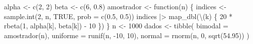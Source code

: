 \documentclass[
  10pt,
  ignorenonframetext,
]{beamer}
\newenvironment{Shaded}{\begin{snugshade}}{\end{snugshade}}
\newcommand{\AttributeTok}[1]{\textcolor[rgb]{0.40,0.45,0.13}{#1}}
\newcommand{\ConstantTok}[1]{\textcolor[rgb]{0.56,0.35,0.01}{#1}}
\newcommand{\ControlFlowTok}[1]{\textcolor[rgb]{0.00,0.23,0.31}{#1}}
\newcommand{\DecValTok}[1]{\textcolor[rgb]{0.68,0.00,0.00}{#1}}
\newcommand{\FloatTok}[1]{\textcolor[rgb]{0.68,0.00,0.00}{#1}}
\newcommand{\FunctionTok}[1]{\textcolor[rgb]{0.28,0.35,0.67}{#1}}
\newcommand{\NormalTok}[1]{\textcolor[rgb]{0.00,0.23,0.31}{#1}}
\newcommand{\OtherTok}[1]{\textcolor[rgb]{0.00,0.23,0.31}{#1}}
\newcommand{\SpecialCharTok}[1]{\textcolor[rgb]{0.37,0.37,0.37}{#1}}
\begin{document}
\begin{frame}[fragile]
\begin{Shaded}
\begin{Highlighting}[]
\NormalTok{alpha }\OtherTok{\textless{}{-}} \FunctionTok{c}\NormalTok{(}\DecValTok{2}\NormalTok{, }\DecValTok{2}\NormalTok{)}
\NormalTok{beta }\OtherTok{\textless{}{-}} \FunctionTok{c}\NormalTok{(}\DecValTok{6}\NormalTok{, }\FloatTok{0.8}\NormalTok{)}
\NormalTok{amostrador }\OtherTok{\textless{}{-}} \ControlFlowTok{function}\NormalTok{(n) \{}
\NormalTok{  indices }\OtherTok{\textless{}{-}} \FunctionTok{sample.int}\NormalTok{(}\DecValTok{2}\NormalTok{, n, }\ConstantTok{TRUE}\NormalTok{, }\AttributeTok{prob =} \FunctionTok{c}\NormalTok{(}\FloatTok{0.5}\NormalTok{, }\FloatTok{0.5}\NormalTok{))}
\NormalTok{  indices }\SpecialCharTok{|\textgreater{}} \FunctionTok{map\_dbl}\NormalTok{(\textbackslash{}(k) \{}
    \DecValTok{20} \SpecialCharTok{*} \FunctionTok{rbeta}\NormalTok{(}\DecValTok{1}\NormalTok{, alpha[k], beta[k]) }\SpecialCharTok{{-}} \DecValTok{10}
\NormalTok{  \})}
\NormalTok{\}}
\NormalTok{n }\OtherTok{\textless{}{-}} \DecValTok{1000}
\NormalTok{dados }\OtherTok{\textless{}{-}} \FunctionTok{tibble}\NormalTok{(}
  \AttributeTok{bimodal =} \FunctionTok{amostrador}\NormalTok{(n),}
  \AttributeTok{uniforme =} \FunctionTok{runif}\NormalTok{(n, }\SpecialCharTok{{-}}\DecValTok{10}\NormalTok{, }\DecValTok{10}\NormalTok{),}
  \AttributeTok{normal =} \FunctionTok{rnorm}\NormalTok{(n, }\DecValTok{0}\NormalTok{, }\FunctionTok{sqrt}\NormalTok{(}\FloatTok{54.95}\NormalTok{))}
\NormalTok{)}
\end{Highlighting}
\end{Shaded}
\end{frame}
\end{document}
